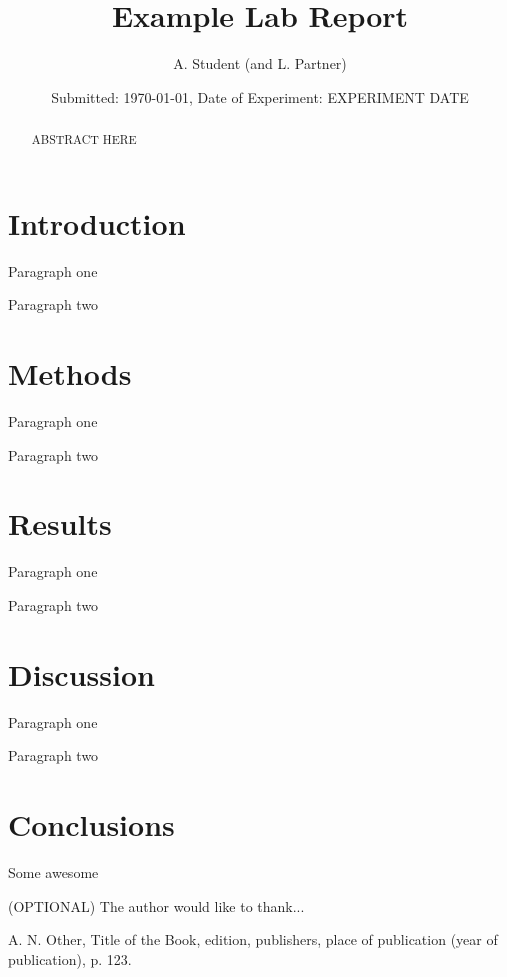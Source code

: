 \documentclass[12pt, onecolumn]{revtex4}    %
\begin{document}
                     


\title{Example Lab Report} 
\date{Submitted: \today{}, Date of Experiment: EXPERIMENT DATE}
\author{A. Student (and L. Partner)}

\begin{abstract}              
 
ABSTRACT HERE

\end{abstract}

\maketitle
\thispagestyle{plain} %



\section{Introduction} 

Paragraph one

Paragraph two


\section{Methods} 

Paragraph one

Paragraph two
 
\section{Results} 

Paragraph one

Paragraph two

\section{Discussion} 

Paragraph one

Paragraph two

\section{Conclusions}
 
Some awesome

\begin{acknowledgments}
(OPTIONAL) The author would like to thank...
\end{acknowledgments}

\begin{thebibliography}{}

 A. N. Other, Title of the Book, edition, publishers, place of publication (year of publication), p. 123.   %


\end{thebibliography} 
\end{document}
